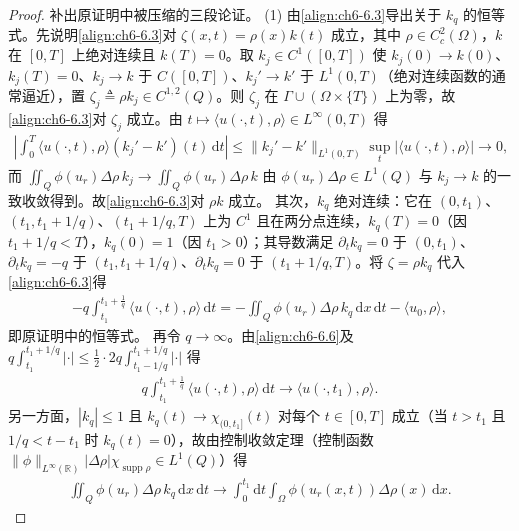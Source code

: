 \documentclass[../../main.tex]{subfiles}%
\begin{document}
\begin{proof}
补出原证明中被压缩的三段论证。
(1) 由\eqref{align:ch6-6.3}导出关于 $k_q$ 的恒等式。先说明\eqref{align:ch6-6.3}对 $\zeta(x,t)=\rho(x)k(t)$ 成立，其中 $\rho\in C^2_c(\Omega)$，$k$ 在 $[0,T]$ 上绝对连续且 $k(T)=0$。取 $k_j\in C^1([0,T])$ 使 $k_j(0)\to k(0)$、$k_j(T)=0$、$k_j\to k$ 于 $C([0,T])$、$k_j'\to k'$ 于 $L^1(0,T)$（绝对连续函数的通常逼近），置 $\zeta_j\triangleq\rho k_j\in C^{1,2}(Q)$。则 $\zeta_j$ 在 $\Gamma\cup(\Omega\times\{T\})$ 上为零，故\eqref{align:ch6-6.3}对 $\zeta_j$ 成立。由 $t\mapsto\langle u(\cdot,t),\rho\rangle\in L^\infty(0,T)$ 得
\begin{align*}
\left|\int_0^T\langle u(\cdot,t),\rho\rangle(k_j'-k')(t)\,\mathrm{d}t\right|
\leqslant\|k_j'-k'\|_{L^1(0,T)}\sup_{t}\left|\langle u(\cdot,t),\rho\rangle\right|\to0,
\end{align*}
而 $\iint_Q\phi(u_r)\Delta\rho\,k_j\to\iint_Q\phi(u_r)\Delta\rho\,k$ 由 $\phi(u_r)\Delta\rho\in L^1(Q)$ 与 $k_j\to k$ 的一致收敛得到。故\eqref{align:ch6-6.3}对 $\rho k$ 成立。
其次，$k_q$ 绝对连续：它在 $(0,t_1)$、$(t_1,t_1+1/q)$、$(t_1+1/q,T)$ 上为 $C^1$ 且在两分点连续，$k_q(T)=0$（因 $t_1+1/q<T$），$k_q(0)=1$（因 $t_1>0$）；其导数满足 $\partial_tk_q=0$ 于 $(0,t_1)$、$\partial_tk_q=-q$ 于 $(t_1,t_1+1/q)$、$\partial_tk_q=0$ 于 $(t_1+1/q,T)$。将 $\zeta=\rho k_q$ 代入\eqref{align:ch6-6.3}得
\begin{align*}
-q\int_{t_1}^{t_1+\frac{1}{q}}\langle u(\cdot,t),\rho\rangle\,\mathrm{d}t
=-\iint_Q\phi(u_r)\Delta\rho\,k_q\,\mathrm{d}x\,\mathrm{d}t-\langle u_0,\rho\rangle,
\end{align*}
即原证明中的恒等式。
再令 $q\to\infty$。由\eqref{align:ch6-6.6}及 $q\int_{t_1}^{t_1+1/q}|\cdot|\leqslant\frac{1}{2}\cdot2q\int_{t_1-1/q}^{t_1+1/q}|\cdot|$ 得
\begin{align*}
q\int_{t_1}^{t_1+\frac{1}{q}}\langle u(\cdot,t),\rho\rangle\,\mathrm{d}t\to\langle u(\cdot,t_1),\rho\rangle .
\end{align*}
另一方面，$|k_q|\leqslant1$ 且 $k_q(t)\to\chi_{(0,t_1]}(t)$ 对每个 $t\in[0,T]$ 成立（当 $t>t_1$ 且 $1/q<t-t_1$ 时 $k_q(t)=0$），故由控制收敛定理（控制函数 $\|\phi\|_{L^\infty(\mathbb{R})}|\Delta\rho|\chi_{\operatorname{supp}\rho}\in L^1(Q)$）得
\begin{align*}
\iint_Q\phi(u_r)\Delta\rho\,k_q\,\mathrm{d}x\,\mathrm{d}t\to\int_0^{t_1}\mathrm{d}t\int_\Omega\phi(u_r(x,t))\Delta\rho(x)\,\mathrm{d}x .

\end{align*}
\end{proof}
\end{document}
